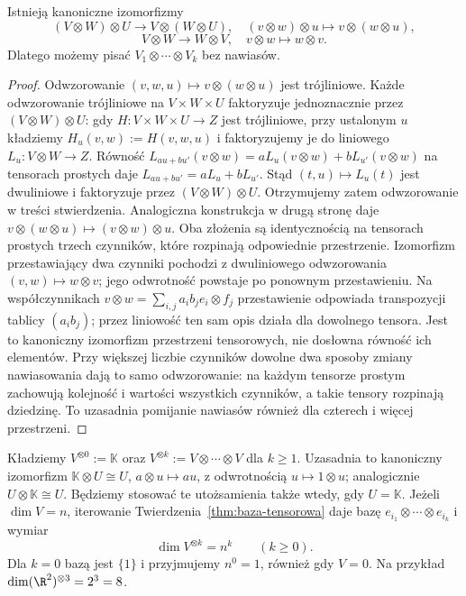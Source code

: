 \begin{stwierdzenie}
\label{prop:tensor-lacznosc}
Istnieją kanoniczne izomorfizmy
\[
 (V\otimes W)\otimes U\longrightarrow V\otimes(W\otimes U),
 \quad (v\otimes w)\otimes u\longmapsto v\otimes(w\otimes u),
\]
\[
 V\otimes W\longrightarrow W\otimes V,
 \quad v\otimes w\longmapsto w\otimes v.
\]
Dlatego możemy pisać $V_1\otimes\cdots\otimes V_k$ bez nawiasów.
\end{stwierdzenie}
\begin{proof}
Odwzorowanie $(v,w,u)\mapsto v\otimes(w\otimes u)$ jest
trójliniowe. Każde odwzorowanie trójliniowe na $V\times W\times U$
faktoryzuje jednoznacznie przez $(V\otimes W)\otimes U$:
gdy $H\colon V\times W\times U\to Z$ jest trójliniowe,
przy ustalonym $u$ kładziemy $H_u(v,w):=H(v,w,u)$
i faktoryzujemy je do liniowego $L_u\colon V\otimes W\to Z$.
Równość
$L_{au+bu'}(v\otimes w)=aL_u(v\otimes w)+bL_{u'}(v\otimes w)$
na tensorach prostych daje $L_{au+bu'}=aL_u+bL_{u'}$.
Stąd $(t,u)\mapsto L_u(t)$ jest dwuliniowe i faktoryzuje
przez $(V\otimes W)\otimes U$. Otrzymujemy zatem odwzorowanie w treści
stwierdzenia. Analogiczna konstrukcja w drugą stronę daje
$v\otimes(w\otimes u)\mapsto(v\otimes w)\otimes u$.
Oba złożenia są identycznością na tensorach prostych trzech
czynników, które rozpinają odpowiednie przestrzenie.
Izomorfizm przestawiający dwa czynniki pochodzi z dwuliniowego
odwzorowania $(v,w)\mapsto w\otimes v$; jego odwrotność powstaje
po ponownym przestawieniu.
Na współczynnikach $v\otimes w=\sum_{i,j}a_i b_j e_i\otimes f_j$
przestawienie odpowiada transpozycji tablicy $(a_i b_j)$;
przez liniowość ten sam opis działa dla dowolnego tensora.
Jest to kanoniczny izomorfizm przestrzeni tensorowych,
nie dosłowna równość ich elementów.
Przy większej liczbie czynników dowolne dwa sposoby zmiany
nawiasowania dają to samo odwzorowanie: na każdym tensorze
prostym zachowują kolejność i wartości wszystkich czynników,
a takie tensory rozpinają dziedzinę. To uzasadnia pomijanie
nawiasów również dla czterech i więcej przestrzeni.
\end{proof}

Kładziemy $V^{\otimes0}:=\mathbb K$ oraz
$V^{\otimes k}:=V\otimes\cdots\otimes V$ dla $k\geq1$.
Uzasadnia to kanoniczny izomorfizm
$\mathbb K\otimes U\cong U$, $a\otimes u\mapsto au$,
z odwrotnością $u\mapsto1\otimes u$; analogicznie
$U\otimes\mathbb K\cong U$. Będziemy stosować te
utożsamienia także wtedy, gdy $U=\mathbb K$.
Jeżeli $\dim V=n$, iterowanie Twierdzenia~\ref{thm:baza-tensorowa}
daje bazę $e_{i_1}\otimes\cdots\otimes e_{i_k}$ i wymiar
\begin{equation}\label{eq:dim-potega-tensorowa}
 \dim V^{\otimes k}=n^k\qquad(k\geq0).
\end{equation}
Dla $k=0$ bazą jest $\{1\}$ i przyjmujemy $n^0=1$,
również gdy $V=0$. Na przykład
$\dim(\R^2)^{\otimes3}=2^3=8$.

